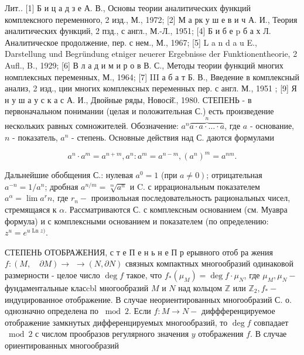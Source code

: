 \documentclass[10pt]{article}
\begin{document}
Лит.. [1] Б и ц а д з е А. В., Основы теории аналитических функций комплексного переменного, 2 изд., М., 1972; [2] М а рк у ш е в и ч А. И., Теория аналитических функций, 2 пзд., с англ., М.-Л., 1951; [4] Б и б е p б а х Л. Аналитическое продолжение, пер. с нем., М., 1967; [5] L a n d a u E., Darstellung und Begründung etniger neuerer Ergebnisse der Funktionentheorie, 2 Aufl., B., 1929; [6] В л а д и м и р о в В. С., Методы теории функций многих номплексных переменных, М., 1964; [7] III а б а т Б. В., Введение в комплексный анализ, 2 изд., ции многих комплексных переменных пер. с англ. М., 1951 ; [9] Я н у ш а у с к а с А. И., Двойные ряды, Новосй̄., 1980. СТЕПЕНЬ - в первоначальном понимании (целая и положительная С.) есть произведение нескольких равных сомножителей. Обозначение: $a^{n} \overbrace{a \cdot a \cdot \ldots \cdot a}^{n}$, где $a$ - основание, $n$ - показатель, $a^{n}$ - степень. Основные действия над С. даются формулами



\[

a^{n} \cdot a^{m}=a^{n+m}, a^{n}: a^{m}=a^{n-m},\left(a^{n}\right)^{m}=a^{n m} .

\]



Дальнейшие обобщения С.: нулевая $a^{0}=1$ (при $\left.a \neq 0\right)$; отрицательная $a^{-n}=1 / a^{n}$; дробная $a^{n / m}=\sqrt[m]{a^{n}}$ и $\mathrm{C}$. с иррациональным показателем $a^{\alpha}=\lim a^{r} n$, где $r_{n}-$ произвольная последовательность рациональных чисел, стремящаяся к $\alpha$. Рассматриваются С. с комплексным основанием (см. Муавра формула) и с комплексными основанием и показателем (по определению: $z^{u}=e^{u \operatorname{Ln} z)}$.



СТЕПЕНЬ ОТОБРАЖЕНИЯ, с т е П е н ь н е П р ерывного отоб ра жения $f:(M, \quad \partial M) \rightarrow$ $\rightarrow(N, \partial N)$ связных компактных многообразий одинаковой размерности - целое число $\operatorname{deg} f$ такое, что $f_{*}\left(\mu_{M}\right)=\operatorname{deg} f \cdot \mu_{N}$, где $\mu_{M}, \mu_{N}-$ фундаментальные класcbl многообразий $M$ и $N$ над кольцом $\mathbb{Z}$ или $\mathbb{Z}_{2}, f_{*}-$ индуцированное отображение. В случае неориентированных многообразий С. о. однозначно определена по $\bmod 2$. Если $f: M \rightarrow N-$ диффференцируемое отображение замкнутых дифференцируемых многообразий, то $\operatorname{deg} f$ совпадает $\bmod 2$ с числом прообразов регулярного значения $y$ отображения $f$. В случае ориентированных многообразий
\end{document}

